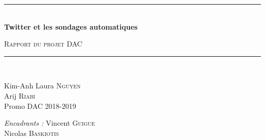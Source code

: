 \documentclass[a4paper]{article}
\newcommand{\HRule}{\rule{\linewidth}{0.5mm}}
\begin{document}
\begin{titlepage}
  \begin{center}


    \vspace{4cm}
    \HRule \\[0.4cm]
    { \huge \bfseries Twitter et les sondages automatiques\\[0.4cm] }

      \textsc{\LARGE Rapport du projet DAC}\\[0.4cm]

    \HRule \\[0.4cm]

    \begin{minipage}{0.4\textwidth}
      \begin{flushleft} \large
        Kim-Anh Laura \textsc{Nguyen}\\
        Arij \textsc{Riabi}\\
        Promo DAC 2018-2019 \\
      \end{flushleft}
    \end{minipage}
    \begin{minipage}{0.5\textwidth}
      \begin{flushright} \large
          \emph{Encadrants :} Vincent \textsc{Guigue} \\
          Nicolas \textsc{Baskiotis}\\
      \end{flushright}
    \end{minipage}

      \vspace{2cm}

  \end{center}
\end{titlepage}

\newpage

\tableofcontents
\end{document}
